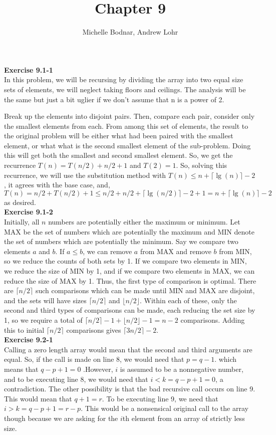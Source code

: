 \documentclass{article}
\title{Chapter 9}
\author{Michelle Bodnar, Andrew Lohr}
\begin{document}
\maketitle

\noindent\textbf{ Exercise 9.1-1} \\
In this problem, we will be recursing by dividing the array into two equal size sets of elements, we will neglect taking floors and ceilings. The analysis will be the same but just a bit uglier if we don't assume that n is a power of 2.

Break up the elements into disjoint pairs. Then, compare each pair, consider only the smallest elements from each. From among this set of elements, the result to the original problem will be either what had been paired with the smallest element, or what what is the second smallest element of the sub-problem. Doing this will get both the smallest and second smallest element. So, we get the recurrence $T(n)  = T(n/2) + n/2 + 1$ and $T(2)= 1$. So, solving this recurrence, we will use the substitution method with $T(n) \le n + \lceil \lg(n) \rceil -2$, it agrees with the base case, and, $T(n) = n/2 + T(n/2) +1 \le n/2 + n/2 + \lceil\lg(n/2)\rceil -2 +1 =  n + \lceil \lg(n) \rceil -2$ as desired.\\


\noindent\textbf{Exercise 9.1-2}\\

Initially, all $n$ numbers are potentially either the maximum or minimum.  Let MAX be the set of numbers which are potentially the maximum and MIN denote the set of numbers which are potentially the minimum.  Say we compare two elements $a$ and $b$.  If $a \leq b$, we can remove $a$ from MAX and remove $b$ from MIN, so we reduce the counts of both sets by 1.  If we compare two elements in MIN, we reduce the size of MIN by 1, and if we compare two elements in MAX, we can reduce the size of MAX by 1.  Thus, the first type of comparison is optimal.  There are $\lceil n/2 \rceil$ such comparisons which can be made until MIN and MAX are disjoint, and the sets will have sizes $\lceil n/2 \rceil$ and $\lfloor n/2 \rfloor$.  Within each of these, only the second and third types of comparisons can be made, each reducing the set size by 1, so we require a total of $\lceil n/2 \rceil - 1 + \lfloor n/2 \rfloor - 1 = n-2$ comparisons.  Adding this to initial $\lceil n/2 \rceil$ comparisons gives $\lceil 3n/2 \rceil - 2$. \\

\noindent\textbf{ Exercise 9.2-1} \\
Calling a zero length array would mean that the second and third arguments are equal. So, if the call is made on line 8, we would need that $p=q-1$. which means that $q-p+1=0$ .However, $i$ is assumed to be a nonnegative number, and to be executing line 8, we would need that $i < k = q-p+1=0$, a contradiction. The other possibility is that the bad recursive call occurs on line 9. This would mean that $q+1=r$. To be executing line 9, we need that $i>k = q-p+1 = r-p$. This would be a nonsensical original call to the array though because we are asking for the $i$th element from an array of strictly less size. \\
\end{document}
